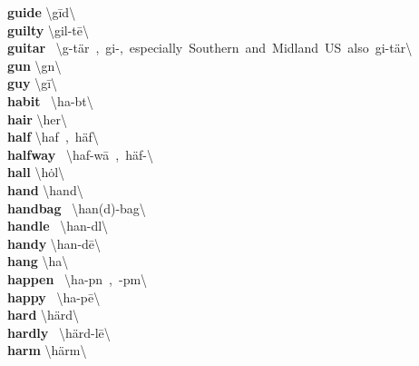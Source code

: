\documentclass[10pt,a4paper]{article}
\begin{document}
\begin{multicols}{2}
\textbf{ guide }\quad \textbackslash \textprimstress g\={i}d\textbackslash \\
\textbf{ guilty }\quad \textbackslash \textprimstress gil-t\={e}\textbackslash \\
\textbf{ guitar }\quad \ \textbackslash g\textschwa -\textprimstress t\"{a}r\ ,\ gi-,\ especially\ Southern\ and\ Midland\ US\ also\ \textprimstress gi-\textsecstress t\"{a}r\textbackslash \\
\textbf{ gun }\quad \textbackslash \textprimstress g\textschwa n\textbackslash \\
\textbf{ guy }\quad \textbackslash \textprimstress g\={i}\textbackslash \\
\textbf{ habit }\quad \ \textbackslash \textprimstress ha-b\textschwa t\textbackslash \\
\textbf{ hair }\quad \textbackslash \textprimstress her\textbackslash \\
\textbf{ half }\quad \textbackslash \textprimstress haf\ ,\ \textprimstress h\"{a}f\textbackslash \\
\textbf{ halfway }\quad \ \textbackslash \textprimstress haf-\textprimstress w\={a}\ ,\ \textprimstress h\"{a}f-\textbackslash \\
\textbf{ hall }\quad \textbackslash \textprimstress h\.{o}l\textbackslash \\
\textbf{ hand }\quad \textbackslash \textprimstress hand\textbackslash \\
\textbf{ handbag }\quad \ \textbackslash \textprimstress han(d)-\textsecstress bag\textbackslash \\
\textbf{ handle }\quad \ \textbackslash \textprimstress han-d\textsuperscript{\textreve}l\textbackslash \\
\textbf{ handy }\quad \textbackslash \textprimstress han-d\={e}\textbackslash \\
\textbf{ hang }\quad \textbackslash \textprimstress ha\engma \textbackslash \\
\textbf{ happen }\quad \ \textbackslash \textprimstress ha-p\textschwa n\ ,\ -p\textsuperscript{\textreve}m\textbackslash \\
\textbf{ happy }\quad \ \textbackslash \textprimstress ha-p\={e}\textbackslash \\
\textbf{ hard }\quad \textbackslash \textprimstress h\"{a}rd\textbackslash \\
\textbf{ hardly }\quad \ \textbackslash \textprimstress h\"{a}rd-l\={e}\textbackslash \\
\textbf{ harm }\quad \textbackslash \textprimstress h\"{a}rm\textbackslash \\

\end{multicols}
\end{document}
